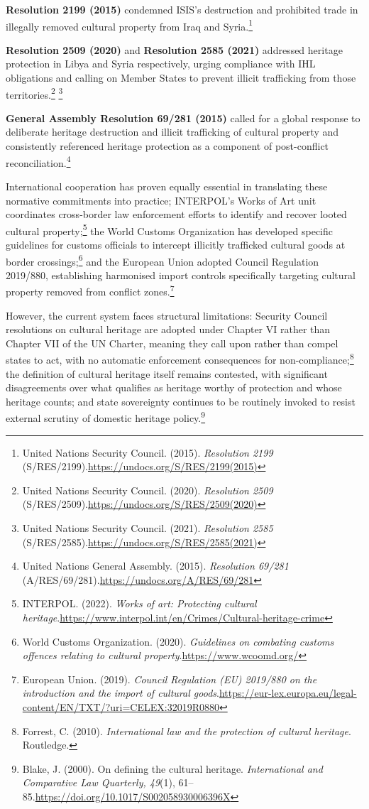 \textbf{Resolution 2199 (2015)} condemned ISIS's destruction and prohibited trade in illegally removed cultural property from Iraq and Syria.\footnote{United Nations Security Council. (2015). \emph{Resolution 2199} (S/RES/2199).\url{https://undocs.org/S/RES/2199(2015)}}

\textbf{Resolution 2509 (2020)} and \textbf{Resolution 2585 (2021)} addressed heritage protection in Libya and Syria respectively, urging compliance with IHL obligations and calling on Member States to prevent illicit trafficking from those territories.\footnote{United Nations Security Council. (2020). \emph{Resolution 2509} (S/RES/2509).\url{https://undocs.org/S/RES/2509(2020)}} \footnote{United Nations Security Council. (2021). \emph{Resolution 2585} (S/RES/2585).\url{https://undocs.org/S/RES/2585(2021)}}

\textbf{General Assembly Resolution 69/281 (2015)} called for a global response to deliberate heritage destruction and illicit trafficking of cultural property and consistently referenced heritage protection as a component of post-conflict reconciliation.\footnote{United Nations General Assembly. (2015). \emph{Resolution 69/281} (A/RES/69/281).\url{https://undocs.org/A/RES/69/281}}

International cooperation has proven equally essential in translating these normative commitments into practice; INTERPOL's Works of Art unit coordinates cross-border law enforcement efforts to identify and recover looted cultural property;\footnote{INTERPOL. (2022). \emph{Works of art: Protecting cultural heritage}.\url{https://www.interpol.int/en/Crimes/Cultural-heritage-crime}} the World Customs Organization has developed specific guidelines for customs officials to intercept illicitly trafficked cultural goods at border crossings;\footnote{World Customs Organization. (2020). \emph{Guidelines on combating customs offences relating to cultural property}.\url{https://www.wcoomd.org/}} and the European Union adopted Council Regulation 2019/880, establishing harmonised import controls specifically targeting cultural property removed from conflict zones.\footnote{European Union. (2019). \emph{Council Regulation (EU) 2019/880 on the introduction and the import of cultural goods}.\url{https://eur-lex.europa.eu/legal-content/EN/TXT/?uri=CELEX:32019R0880}}

However, the current system faces structural limitations: Security Council resolutions on cultural heritage are adopted under Chapter VI rather than Chapter VII of the UN Charter, meaning they call upon rather than compel states to act, with no automatic enforcement consequences for non-compliance;\footnote{Forrest, C. (2010). \emph{International law and the protection of cultural heritage}. Routledge.} the definition of cultural heritage itself remains contested, with significant disagreements over what qualifies as heritage worthy of protection and whose heritage counts; and state sovereignty continues to be routinely invoked to resist external scrutiny of domestic heritage policy.\footnote{Blake, J. (2000). On defining the cultural heritage. \emph{International and Comparative Law Quarterly, 49}(1), 61–85.\url{https://doi.org/10.1017/S002058930006396X}}
